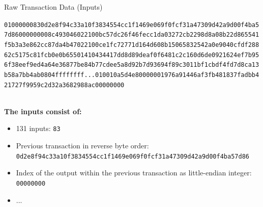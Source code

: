 \documentclass[]{beamer}
\begin{document}
\begin{frame}{Raw Transaction Data (Inputs)}
\begin{scriptsize}
\texttt{\textcolor{black!30}{01000000}{\alert<2>{83}\alert<3>{0d2e8f94c33a10f3834554cc1f1469e069f0fcf31a47309d42a9d00f4ba5
7d86}\alert<4>{00000000}}\textcolor{black!30}{8c493046022100bc57dc26f46fecc1da03272cb2298d8a08b22d865541
f5b3a3e862cc87da4b47022100ce1fc72771d164d608b15065832542a0e9040cfdf288
62c5175c81fcb0e0b65501410434417dd8d89deaf0f6481c2c160d6de0921624ef7b95
6f38eef9ed4a64e36877be84b77cdee5a8d92b7d93694f89c3011bf1cbdf4fd7d8ca13
b58a7bb4ab0804ffffffff...010010a5d4e80000001976a91446af3fb481837fadbb4
21727f9959c2d32a3682988ac00000000}}
\end{scriptsize}
\vspace{1em}
\scriptsize \\
\textbf{The inputs consist of:}\\
\begin{itemize}
	\item \alert<2>{131 inputs: \texttt{83}}
	\item \alert<3>{Previous transaction in reverse byte order: \texttt{0d2e8f94c33a10f3834554cc1f1469e069f0fcf31a47309d42a9d00f4ba57d86}}
	\item \alert<4>{Index of the output within the previous transaction as little-endian integer: \texttt{00000000}}
	\item ...
\end{itemize}
\end{frame}
\end{document}
